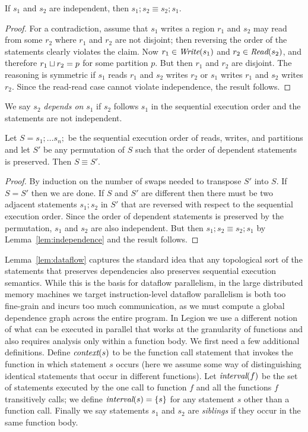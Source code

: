 \begin{lemma}
\rm
\label{lem:independence}
If $s_1$ and $s_2$ are independent, then $s_1; s_2 \equiv s_2; s_1$.
\end{lemma}
\begin{proof}
For a contradiction, assume that $s_1$ writes a region $r_1$ and $s_2$ may read from some $r_2$ where $r_1$ and $r_2$
are not disjoint; then reversing the order of the statements clearly violates the claim.  Now $r_1 \in \mbox{\em Write}(s_1)$
and $r_2 \in \mbox{\em Read}(s_2)$, and therefore $r_1 \sqcup r_2 = p$ for some partition $p$.  But then $r_1$ and $r_2$ are disjoint.
The reasoning is symmetric if $s_1$ reads $r_1$ and $s_2$ writes $r_2$ or $s_1$ writes $r_1$ and $s_2$ writes $r_2$.
Since the read-read case cannot violate independence, the result follows.
\end{proof}
We say $s_2$ {\em depends on} $s_1$ if $s_2$ follows $s_1$ in the sequential execution order and the statements are not independent.
\begin{lemma}
\rm
\label{lem:dataflow}
Let $S = s_1; \ldots s_n;$ be the sequential execution order of reads, writes, and partitions and let $S'$ be any permutation of $S$ such that the order of dependent statements is preserved.  Then $S \equiv S'$.
\end{lemma}
\begin{proof}
By induction on the number of swaps needed to transpose $S'$ into $S$.
If $S = S'$ then we are done.  If $S$ and $S'$ are different then
there must be two adjacent statements $s_1; s_2$ in $S'$ that are
reversed with respect to the sequential execution order.  Since the order of
dependent statements is preserved by the permutation, $s_1$ and $s_2$ are also independent.
But then $s_1; s_2 \equiv s_2; s_1$ by Lemma~\ref{lem:independence} and the result follows.
\end{proof}
Lemma~\ref{lem:dataflow} captures the standard idea that any
topological sort of the statements that preserves dependencies also
preserves sequential execution semantics.  While this is the basis for
dataflow parallelism, in the large distributed memory machines we
target instruction-level dataflow parallelism is both too fine-grain
and incurs too much communication, as we must compute a global
dependence graph across the entire program.  In Legion we use a
different notion of what can be executed in parallel that works at the
granularity of functions and also requires analysis only within a function body.  We
first need a few additional definitions.  Define $\mbox{\em context}(s)$ to be
the function call statement that invokes the function in which
statement $s$ occurs (here we assume some way of distinguishing
identical statements that occur in different functions).  Let
$\mbox{\em interval}(f)$ be the set of statements executed by the one call to
function $f$ and all the functions $f$ transitively calls; we define
$\mbox{\em interval}(s) = \{ s \}$ for any statement $s$ other than a function call.
Finally we say statements $s_1$ and $s_2$ are {\em siblings} if they
occur in the same function body.

